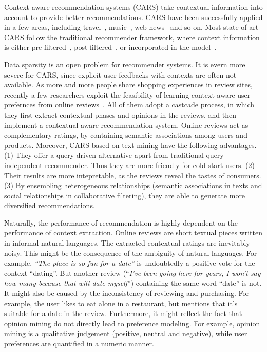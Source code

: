 \documentclass[preprint,12pt]{elsarticle}
\begin{document}
Context aware recommendation systems (CARS) take  contextual information into account to provide better recommendations. CARS have been successfully applied in a few areas, including travel~\cite{Biancalana2013Approach}, music~\cite{Cai2007MusicSense}, web news~\cite{Wang2015CROWN} and so on. Most state-of-art CARS follow the traditional recommender framework, where context information is either pre-filtered~\cite{Adomavicius2005Incorporating}, post-filtered~\cite{Baltrunas2009Context}, or incorporated in the model~\cite{Palmisano2008Using,Wang2015CROWN,Karatzoglou2010Multiverse}.

Data sparsity is an open problem for recommender systems. It is evern more severe for CARS, since explicit user feedbacks with contexts are often not available. As more and more people share shopping experiences in review sites, recently a few researchers exploit the feasibility of learning context aware user prefernces from online reviews~\cite{Li2010Contextual,Levi2012Finding,Hariri2013Query,Liu2013Combining}. All of them adopt a castcade process, in which they first extract contextual phases and opinions in the reviews, and then implement a contextual aware recommendation system. Online reviews act as complementary ratings, by containing semantic associations among users and products. Moreover, CARS based on text mining have the following advantages. (1) They offer a query driven alternative apart from traditional query independent recommender. Thus they are more friendly for cold-start users. (2) Their results are more intepretable, as the reviews reveal the tastes of consumers. (3) By ensembling heterogeneous relationships (semantic associations in texts and social relationships in collaborative filtering), they are able to generate more diversified recommendations.

Naturally, the performance of recommendation is highly dependent on the performance of context extraction. Online reviews are short textual pieces written in informal natural languages. The extracted contextual ratings are inevitably noisy. This might be the consequence of the ambiguity of natural languages. For example, \textit{``The place is so fun for a date''} is undoubtedly a positive vote for the context ``dating''. But another review (``\textit{I've been going here for years, I won't say how many because that will date myself}'') containing the same word ``date'' is not. It might also be caused by the inconsistency of reviewing and purchasing. For example, the user likes to eat alone in a restaurant, but mentions that it's suitable for a date in the review. Furthermore, it might reflect the fact that opinion mining do not directly lead to preference modeling. For example, opinion mining is a qualitative judgement (positive, neutral and negative), while user preferences are quantified in a numeric manner.
\end{document}
